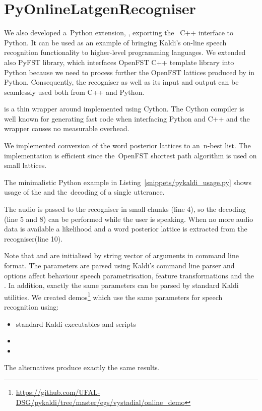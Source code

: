 \section{PyOnlineLatgenRecogniser}
\label{sec:pyext}

We also developed a~Python extension, , exporting the~ C++ interface to Python.
It can be used as an example of bringing Kaldi's on-line speech recognition functionality to higher-level programming languages.
We extended also PyFST library\cite{pyfst2014url}, which interfaces OpenFST C++ template library into Python because we need to process further the OpenFST lattices produced by  in Python.
Consequently, the recogniser as well as its input and output can be seamlessly used both from C++ and Python.

 is a thin wrapper around  implemented using Cython\cite{cython2014url}.
The Cython compiler is well known for generating fast code when interfacing Python and C++ and the wrapper causes no measurable overhead.

We implemented conversion of the word posterior lattices to an~n-best list.
The implementation is efficient since the~OpenFST shortest path algorithm is used on small lattices.

The minimalistic Python example in Listing~\ref{snippets/pykaldi_usage.py} shows usage of the  and the~decoding of a single utterance.

The audio is passed to the recogniser in small chunks (line 4), so the decoding (line 5 and 8) can be performed while the user is speaking.
When no more audio data is available a likelihood and a word posterior lattice is extracted from the recogniser(line 10).

Note that  and  are initialised by string vector of arguments in command line format.
The parameters are parsed using Kaldi's command line parser and options affect behaviour speech parametrisation, feature transformations and  the .
In addition, exactly the same parameters can be parsed by standard Kaldi utilities. 
We created demos\footnote{\url{https://github.com/UFAL-DSG/pykaldi/tree/master/egs/vystadial/online_demo}} which use the same parameters for speech recognition using:
\begin{itemize}
    \item standard Kaldi executables and scripts
    \item {} 
    \item {}
\end{itemize}
The alternatives produce exactly the same results.

